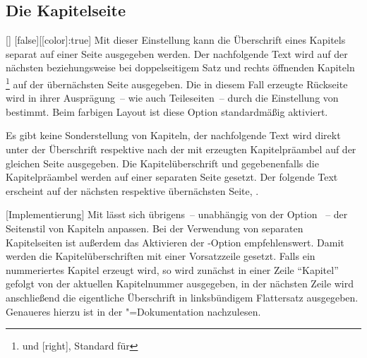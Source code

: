 \subsection{Die Kapitelseite}
\begin{Declaration}{[\PBoolean]}%
  [false][[color]:true]%
\printdeclarationlist%
\label{sec:chapter}%
%
%
%
Mit dieser Einstellung kann die Überschrift eines Kapitels separat auf einer 
Seite ausgegeben werden. Der nachfolgende Text wird auf der nächsten 
beziehungsweise bei doppelseitigem Satz und rechts öffnenden Kapiteln%
\footnote{%
   und [right], Standard für 
}
auf der übernächsten Seite ausgegeben. Die in diesem Fall erzeugte Rückseite 
wird in ihrer Ausprägung~-- wie auch Teileseiten~-- durch die Einstellung von 
 bestimmt. Beim farbigen Layout ist diese Option 
standardmäßig aktiviert. \notudscrartcl
%
\begin{values}
\itemfalse
  Es gibt keine Sonderstellung von Kapiteln, der nachfolgende Text wird direkt 
  unter der Überschrift respektive nach der mit  
  erzeugten Kapitelpräambel auf der gleichen Seite ausgegeben.
\itemtrue*
  Die Kapitelüberschrift und gegebenenfalls die Kapitelpräambel werden auf 
  einer separaten Seite gesetzt. Der folgende Text erscheint auf der nächsten   
  respektive übernächsten Seite, .
\end{values}
%
[Implementierung]
Mit %
 lässt sich übrigens~-- unabhängig von der Option 
~-- der Seitenstil von Kapiteln anpassen. Bei der 
Verwendung von separaten Kapitelseiten ist außerdem das Aktivieren der 
\KOMAScript-Option  empfehlenswert. Damit werden die
Kapitelüberschriften mit einer Vorsatzzeile gesetzt. Falls ein nummeriertes 
Kapitel erzeugt wird, so wird zunächst in einer Zeile \enquote{Kapitel} gefolgt 
von der aktuellen Kapitelnummer ausgegeben, in der nächsten Zeile wird 
anschließend die eigentliche Überschrift in linksbündigem Flattersatz 
ausgegeben. Genaueres hierzu ist in der \KOMAScript"=Dokumentation 
nachzulesen.
\end{Declaration}



